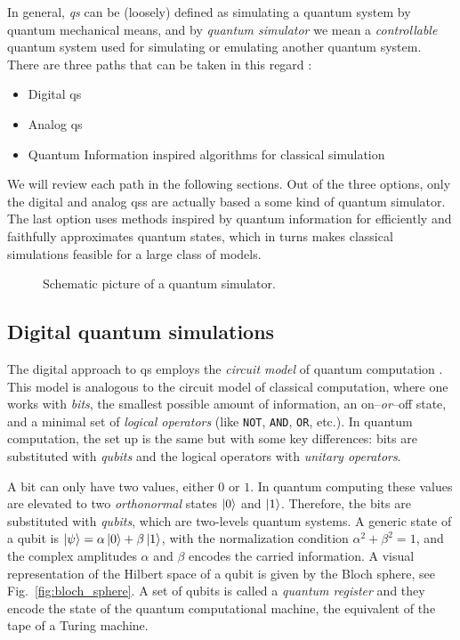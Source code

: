 In general, \emph{\acf{qs}} can be (loosely) defined as simulating a quantum system by quantum mechanical means, and by \emph{quantum simulator} we mean a \emph{controllable} quantum system used for simulating or emulating another quantum system.
There are three paths that can be taken in this regard \cite{georgescu2014simulation}:
\begin{itemize}
    \item Digital \acl{qs}
    \item Analog \acl{qs}
    \item Quantum Information inspired algorithms for classical simulation
\end{itemize}
We will review each path in the following sections.
Out of the three options, only the digital and analog \acp{qs} are actually based a some kind of quantum simulator.
The last option uses methods inspired by quantum information for efficiently and faithfully approximates quantum states, which in turns makes classical simulations feasible for a large class of models.


\begin{figure}[t]
    \centering
    
    \caption{Schematic picture of a quantum simulator.}
\end{figure}


%
%
\subsection{Digital quantum simulations}
\label{sub:digital_quantum_simulations}

The digital approach to \ac{qs} employs the \emph{circuit model} of quantum computation \cite{nielsen2010quantum, deutsch1989quantum}.
This model is analogous to the circuit model of classical computation, where one works with \emph{bits}, the smallest possible amount of information, an on--\emph{or}--off state, and a minimal set of \emph{logical operators} (like \texttt{NOT}, \texttt{AND}, \texttt{OR}, etc.).
In quantum computation, the set up is the same but with some key differences:
bits are substituted with \emph{qubits} and the logical operators with \emph{unitary operators}.

A bit can only have two values, either $0$ or $1$.
In quantum computing these values are elevated to two \emph{orthonormal} states $\ket{0}$ and $\ket{1}$.
Therefore, the bits are substituted with \emph{qubits}, which are two-levels quantum systems.
A generic state of a qubit is $\ket{\psi} = \alpha \ket{0} + \beta \ket{1}$, with the normalization condition $\alpha^2 + \beta^2 = 1$, and the complex amplitudes $\alpha$ and $\beta$ encodes the carried information.
A visual representation of the Hilbert space of a qubit is given by the Bloch sphere, see Fig.~\ref{fig:bloch_sphere}.
A set of qubits is called a \emph{quantum register} and they encode the state of the quantum computational machine, the equivalent of the tape of a Turing machine.


